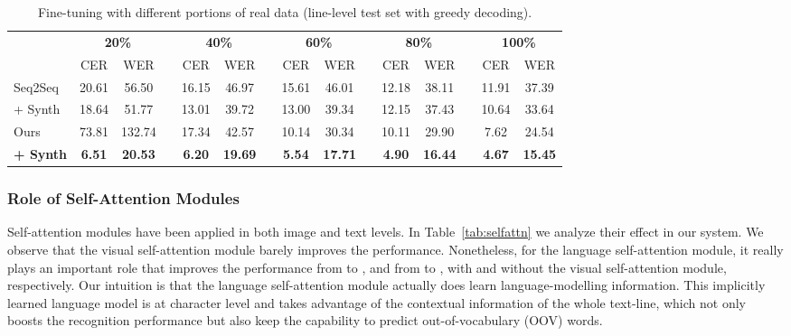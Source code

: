 \documentclass[10pt,twocolumn,letterpaper]{article}
\begin{document}
\begin{table*}[t!h]
    \caption{Fine-tuning with different portions of real data (line-level test set with greedy decoding).}
    \label{tab:fine}
    \centering
\begin{tabular}{lcccccccccccccc}
    \toprule
      & \multicolumn{2}{c}{\textbf{20\%}} && \multicolumn{2}{c}{\textbf{40\%}} && \multicolumn{2}{c}{\textbf{60\%}} && \multicolumn{2}{c}{\textbf{80\%}}&& \multicolumn{2}{c}{\textbf{100\%}}\\
    \cmidrule{2-3}\cmidrule{5-6}\cmidrule{8-9}\cmidrule{11-12}\cmidrule{14-15}
    & CER & WER && CER & WER && CER & WER && CER & WER && CER & WER\\
    \midrule
    Seq2Seq  & 20.61 & 56.50 && 16.15 & 46.97 && 15.61 & 46.01 && 12.18 & 38.11 && 11.91 & 37.39\\
    + Synth & 18.64 & 51.77 && 13.01 & 39.72 && 13.00 & 39.34  && 12.15 & 37.43 && 10.64 & 33.64 \\
    \midrule
    Ours & 73.81 & 132.74 && 17.34 & 42.57 && 10.14 & 30.34 && 10.11 & 29.90 && 7.62 & 24.54\\
    \textbf{+ Synth} & \textbf{6.51} & \textbf{20.53} && \textbf{6.20} & \textbf{19.69} && \textbf{5.54} & \textbf{17.71} && \textbf{4.90} & \textbf{16.44} && \textbf{4.67} & \textbf{15.45}\\
    \bottomrule
    \end{tabular}
\end{table*}

\subsubsection{Role of Self-Attention Modules}
Self-attention modules have been applied in both image and text levels. In Table~\ref{tab:selfattn} we analyze their effect in our system. We observe that the visual self-attention module barely improves the performance. Nonetheless, for the language self-attention module, it really plays an important role that improves the performance from  to , and from  to , with and without the visual self-attention module, respectively. Our intuition is that the language self-attention module actually does learn language-modelling information. This implicitly learned language model is at character level and takes advantage of the contextual information of the whole text-line, which not only boosts the recognition performance but also keep the capability to predict out-of-vocabulary (OOV) words.
\end{document}
